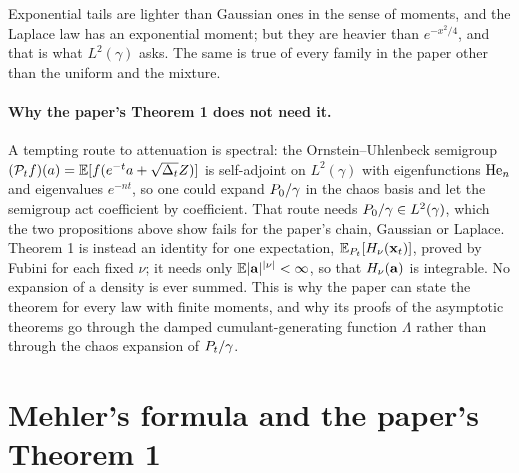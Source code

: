 Exponential tails are lighter than Gaussian ones in the sense of moments, and the
Laplace law has an exponential moment; but they are heavier than $e^{-x^2/4}$, and that
is what $L^2(\gamma)$ asks. The same is true of every family in the paper other than
the uniform and the mixture.

\paragraph{Why the paper's Theorem 1 does not need it.}
A tempting route to attenuation is spectral: the Ornstein--Uhlenbeck semigroup
$(\mathcal P_tf)(a)=\mathbb{E}[f(e^{-t}a+\sqrt{\Delta_t}Z)]$ is self-adjoint on $L^2(\gamma)$ with
eigenfunctions $\mathrm{He}_{n}$ and eigenvalues $e^{-nt}$, so one could expand $P_0/\gamma$ in
the chaos basis and let the semigroup act coefficient by coefficient. That route
needs $P_0/\gamma\in L^2(\gamma)$, which the two propositions above show fails for the
paper's chain, Gaussian or Laplace. Theorem 1 is instead an identity for one
expectation, $\mathbb{E}_{P_t}[H_\nu(\mathbf{x}_t)]$, proved by Fubini for each fixed $\nu$; it needs
only $\mathbb{E}|\mathbf{a}|^{|\nu|}<\infty$, so that $H_\nu(\mathbf{a})$ is integrable. No expansion of a
density is ever summed. This is why the paper can state the theorem for every law
with finite moments, and why its proofs of the asymptotic theorems go through the
damped cumulant-generating function $\Lambda$ rather than through the chaos expansion of $P_t/\gamma$.

\section{Mehler's formula and the paper's Theorem 1}

